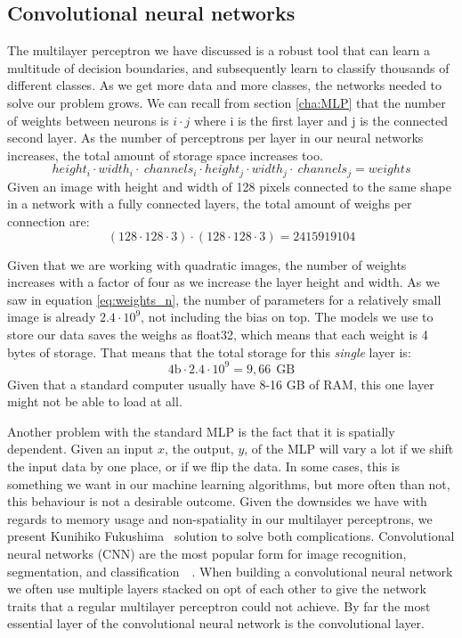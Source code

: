 \subsection{Convolutional neural networks}
\label{cha:convNet}
The multilayer perceptron we have discussed is a robust tool that can learn a multitude of decision boundaries, and subsequently learn to classify thousands of different classes. 
As we get more data and more classes, the networks needed to solve our problem grows. We can recall from section \ref{cha:MLP} that the number of weights between neurons is $i \cdot j$ where i is the first layer and j is the connected second layer. As the number of perceptrons per layer in our neural networks increases, the total amount of storage space increases too. 
\begin{equation}
    \label{eq:weights_l}
     height_i \cdot width_i \cdot \ channels_i \cdot height_j \cdot width_j \cdot \ channels_j  = weights
\end{equation}
Given an image with height and width of 128 pixels connected to the same shape in a network with a fully connected layers, the total amount of weighs per connection  are:\\
\begin{equation}
    \label{eq:weights_n}
     (128\cdot 128\cdot 3) \cdot (128\cdot 128\cdot 3) = 2415919104  
\end{equation}

Given that we are working with quadratic images, the number of weights increases with a factor of four as we increase the layer height and width. As we saw in equation \ref{eq:weights_n}, the number of parameters for a relatively small image is already $2.4 \cdot 10^9$, not including the bias on top.
The models we use to store our data saves the weighs as float32, which means that each weight is 4 bytes of storage. That means that the total storage for this \textit{single} layer is:
\begin{equation}
    \label{eq:weights_GB}
    4\text{b} \cdot 2.4 \cdot 10^9 = 9,66 \ \ \text{GB}
\end{equation}
Given that a standard computer usually have 8-16 GB of RAM, this one layer might not be able to load at all. 
 



Another problem with the standard MLP is the fact that it is spatially dependent. Given an input $x$, the output, $y$, of the MLP will vary a lot if we shift the input data by one place, or if we flip the data. In some cases, this is something we want in our machine learning algorithms, but more often than not, this behaviour is not a desirable outcome.
Given the downsides we have with regards to memory usage and non-spatiality in our multilayer perceptrons, we present Kunihiko Fukushima~\cite{Fukushima1980} solution to solve both complications.
Convolutional neural networks (CNN) are the most popular form for image recognition, segmentation, and classification~\cite{NIPS2012_4824}~\cite{Long_2015_CVPR}.
When building a convolutional neural network we often use multiple layers stacked on opt of each other to give the network traits that a regular multilayer perceptron could not achieve. By far the most essential layer of the convolutional neural network is the convolutional layer.


